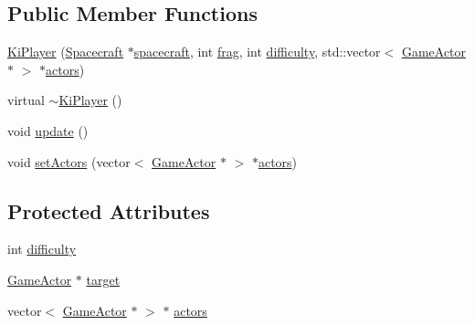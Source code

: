 \subsection*{Public Member Functions}
\begin{DoxyCompactItemize}
\item 
\hyperlink{class_ki_player_a1318a742ac4aec02029d9ee40e12f81a}{Ki\+Player} (\hyperlink{class_spacecraft}{Spacecraft} $\ast$\hyperlink{class_player_a7cc88a054d2329b1ca7472a86b2030ca}{spacecraft}, int \hyperlink{class_player_a9528a6db252f2fe947fd7d9189837aec}{frag}, int \hyperlink{class_ki_player_af7ba0444a46f7d46b6af4b31a2808c2a}{difficulty}, std\+::vector$<$ \hyperlink{class_game_actor}{Game\+Actor} $\ast$ $>$ $\ast$\hyperlink{class_ki_player_a0da596a3550eaccd42d70c915b588303}{actors})
\item 
virtual \hyperlink{class_ki_player_a39d044891328faf5729f51da98a243da}{$\sim$\+Ki\+Player} ()
\item 
void \hyperlink{class_ki_player_aa37188fb341bd2a8f4c19846371ed709}{update} ()
\item 
void \hyperlink{class_ki_player_a402c0a7e2a8eca8983783a6f9450c57b}{set\+Actors} (vector$<$ \hyperlink{class_game_actor}{Game\+Actor} $\ast$ $>$ $\ast$\hyperlink{class_ki_player_a0da596a3550eaccd42d70c915b588303}{actors})
\end{DoxyCompactItemize}
\subsection*{Protected Attributes}
\begin{DoxyCompactItemize}
\item 
int \hyperlink{class_ki_player_af7ba0444a46f7d46b6af4b31a2808c2a}{difficulty}
\item 
\hyperlink{class_game_actor}{Game\+Actor} $\ast$ \hyperlink{class_ki_player_ade46a263a1242d7fa6e20d72008437ab}{target}
\item 
vector$<$ \hyperlink{class_game_actor}{Game\+Actor} $\ast$ $>$ $\ast$ \hyperlink{class_ki_player_a0da596a3550eaccd42d70c915b588303}{actors}
\end{DoxyCompactItemize}



